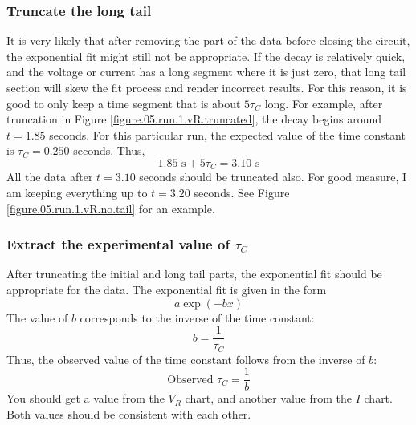 \subsubsection{Truncate the long tail}
It is very likely that after removing the part of the data before closing the circuit, the exponential fit might still not be appropriate. If the decay is relatively quick, and the voltage or current has a long segment where it is just zero, that long tail section will skew the fit process and render incorrect results. For this reason, it is good to only keep a time segment that is about $5\tau_{C}$ long. For example, after truncation in Figure \ref{figure.05.run.1.vR.truncated}, the decay begins around $t = 1.85$ seconds. For this particular run, the expected value of the time constant is $\tau_{C} = 0.250$ seconds. Thus,
\begin{equation}
    1.85 \text{ s} + 5 \tau_{C} = 3.10 \text{ s}
\end{equation}
All the data after $t = 3.10$ seconds should be truncated also. For good measure, I am keeping everything up to $t = 3.20$ seconds. See Figure \ref{figure.05.run.1.vR.no.tail} for an example.
\subsubsection{Extract the experimental value of $\tau_{C}$}
After truncating the initial and long tail parts, the exponential fit should be appropriate for the data. The exponential fit is given in the form
\begin{equation}
    a \exp(-bx)
\end{equation}
The value of $b$ corresponds to the inverse of the time constant:
\begin{equation}
    b = \frac{1}{\tau_{C}}
\end{equation}
Thus, the observed value of the time constant follows from the inverse of $b$:
\begin{equation}
    \text{Observed } \tau_{C} = \frac{1}{b}
\end{equation}
You should get a value from the $V_{R}$ chart, and another value from the $I$ chart. Both values should be consistent with each other.
